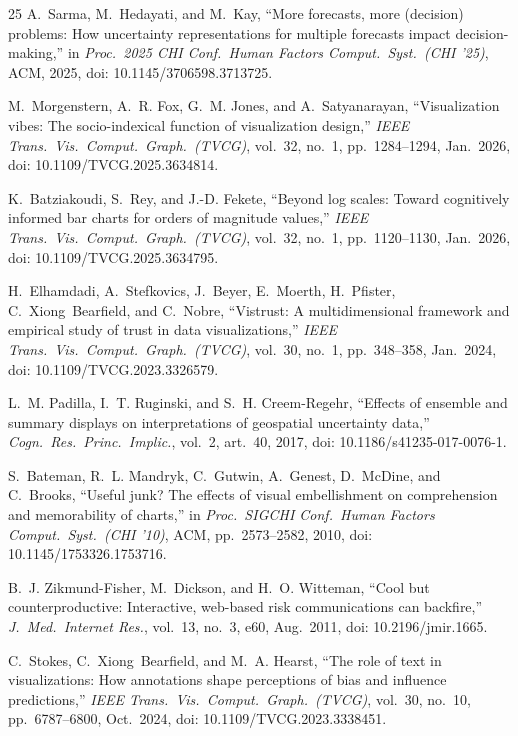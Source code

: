 \documentclass[conference]{IEEEtran}
\begin{document}
\begin{thebibliography}{25}
A.~Sarma, M.~Hedayati, and M.~Kay, ``More forecasts, more (decision) problems: How uncertainty representations for multiple forecasts impact decision-making,'' in \textit{Proc.\ 2025 CHI Conf.\ Human Factors Comput.\ Syst.\ (CHI '25)}, ACM, 2025, doi: 10.1145/3706598.3713725.

M.~Morgenstern, A.~R. Fox, G.~M. Jones, and A.~Satyanarayan, ``Visualization vibes: The socio-indexical function of visualization design,'' \textit{IEEE Trans.\ Vis.\ Comput.\ Graph.\ (TVCG)}, vol.~32, no.~1, pp.~1284--1294, Jan.\ 2026, doi: 10.1109/TVCG.2025.3634814.

K.~Batziakoudi, S.~Rey, and J.-D. Fekete, ``Beyond log scales: Toward cognitively informed bar charts for orders of magnitude values,'' \textit{IEEE Trans.\ Vis.\ Comput.\ Graph.\ (TVCG)}, vol.~32, no.~1, pp.~1120--1130, Jan.\ 2026, doi: 10.1109/TVCG.2025.3634795.

H.~Elhamdadi, A.~Stefkovics, J.~Beyer, E.~Moerth, H.~Pfister, C.~Xiong~Bearfield, and C.~Nobre, ``Vistrust: A multidimensional framework and empirical study of trust in data visualizations,'' \textit{IEEE Trans.\ Vis.\ Comput.\ Graph.\ (TVCG)}, vol.~30, no.~1, pp.~348--358, Jan.\ 2024, doi: 10.1109/TVCG.2023.3326579.

L.~M. Padilla, I.~T. Ruginski, and S.~H. Creem-Regehr, ``Effects of ensemble and summary displays on interpretations of geospatial uncertainty data,'' \textit{Cogn.\ Res.\ Princ.\ Implic.}, vol.~2, art.~40, 2017, doi: 10.1186/s41235-017-0076-1.

S.~Bateman, R.~L. Mandryk, C.~Gutwin, A.~Genest, D.~McDine, and C.~Brooks, ``Useful junk? The effects of visual embellishment on comprehension and memorability of charts,'' in \textit{Proc.\ SIGCHI Conf.\ Human Factors Comput.\ Syst.\ (CHI '10)}, ACM, pp.~2573--2582, 2010, doi: 10.1145/1753326.1753716.

B.~J. Zikmund-Fisher, M.~Dickson, and H.~O. Witteman, ``Cool but counterproductive: Interactive, web-based risk communications can backfire,'' \textit{J.\ Med.\ Internet Res.}, vol.~13, no.~3, e60, Aug.\ 2011, doi: 10.2196/jmir.1665.

C.~Stokes, C.~Xiong~Bearfield, and M.~A. Hearst, ``The role of text in visualizations: How annotations shape perceptions of bias and influence predictions,'' \textit{IEEE Trans.\ Vis.\ Comput.\ Graph.\ (TVCG)}, vol.~30, no.~10, pp.~6787--6800, Oct.\ 2024, doi: 10.1109/TVCG.2023.3338451.


\end{thebibliography}
\end{document}
